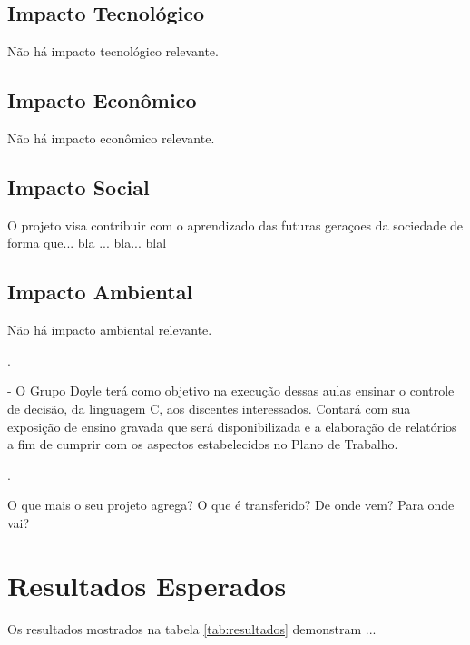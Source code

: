\documentclass[a4paper,10pt]{article}  %
\begin{document}
\subsection{Impacto Tecnológico}

Não há impacto tecnológico relevante.

\subsection{Impacto Econômico}

Não há impacto econômico relevante.

\subsection{Impacto Social}

O projeto visa contribuir com o aprendizado das futuras geraçoes da sociedade de forma que... bla ... bla... blal

\subsection{Impacto Ambiental}

Não há impacto ambiental relevante.

.

 - O Grupo Doyle terá como objetivo na execução dessas aulas ensinar o controle de decisão, da linguagem C, aos discentes interessados.
 Contará com sua exposição de ensino gravada que será disponibilizada e a elaboração de relatórios a fim de cumprir com os aspectos estabelecidos no Plano de Trabalho.


.

O que mais o seu projeto agrega? O que é transferido? De onde vem? Para onde vai?


\section{Resultados Esperados}

Os resultados mostrados na tabela \ref{tab:resultados} demonstram ...
\end{document}
